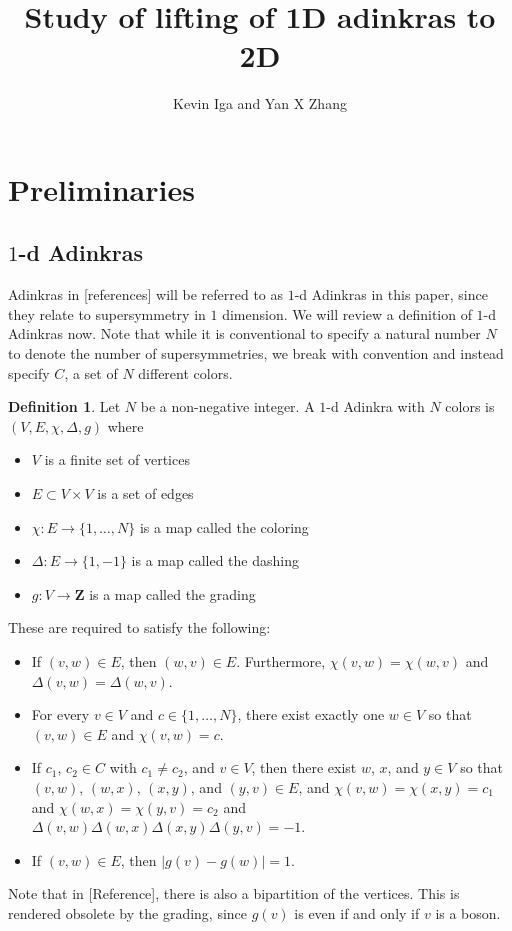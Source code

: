 \documentclass[12pt,twoside,singlespace]{article}
\title{Study of lifting of 1D adinkras to 2D}
\author{Kevin Iga and Yan X Zhang}
\numberwithin{equation}{section}
\theoremstyle{definition}
\newtheorem{definition}[equation]{Definition}
\newcommand{\ZZ}{\mathbf{Z}}
\begin{document}
\pagestyle{plain}

\maketitle

\section{Preliminaries}

\subsection{$1$-d Adinkras}
Adinkras in [references] will be referred to as $1$-d Adinkras in this paper, since they relate to supersymmetry in $1$ dimension.  We will review a definition of $1$-d Adinkras now.  Note that while it is conventional to specify a natural number $N$ to denote the number of supersymmetries, we break with convention and instead specify $C$, a set of $N$ different colors.

\begin{definition}
Let $N$ be a non-negative integer.  A $1$-d Adinkra with $N$ colors is $(V,E,\chi,\Delta,g)$ where
\begin{itemize}
\item $V$ is a finite set of vertices
\item $E\subset V\times V$ is a set of edges
\item $\chi:E\to \{1,\ldots,N\}$ is a map called the coloring
\item $\Delta:E\to \{1,-1\}$ is a map called the dashing
\item $g:V\to\ZZ$ is a map called the grading
\end{itemize}

These are required to satisfy the following:
\begin{itemize}
\item If $(v,w)\in E$, then $(w,v)\in E$.  Furthermore, $\chi(v,w)=\chi(w,v)$ and $\Delta(v,w)=\Delta(w,v)$.
\item For every $v\in V$ and $c\in \{1,\ldots,N\}$, there exist exactly one $w\in V$ so that $(v,w)\in E$ and $\chi(v,w)=c$.
\item If $c_1$, $c_2\in C$ with $c_1\not=c_2$, and $v\in V$, then there exist $w$, $x$, and $y\in V$ so that $(v,w)$, $(w,x)$, $(x,y)$, and $(y,v)\in E$, and $\chi(v,w)=\chi(x,y)=c_1$ and $\chi(w,x)=\chi(y,v)=c_2$ and $\Delta(v,w)\Delta(w,x)\Delta(x,y)\Delta(y,v)=-1$.
\item If $(v,w)\in E$, then $|g(v)-g(w)|=1$.
\end{itemize}
\end{definition}
Note that in [Reference], there is also a bipartition of the vertices.  This is rendered obsolete by the grading, since $g(v)$ is even if and only if $v$ is a boson.
\end{document}
